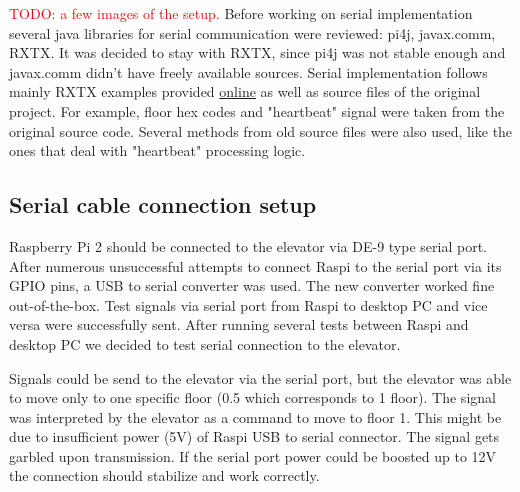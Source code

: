 \documentclass[a4paper, 12pt]{article}
\newcommand\todo[1]{\textcolor{red}{#1}}
\begin{document}
\todo{TODO: a few images of the setup.}
Before working on serial implementation several java libraries for serial communication were reviewed: pi4j, javax.comm, RXTX.
It was decided to stay with RXTX, since pi4j was not stable enough and javax.comm didn't have freely available sources.
Serial implementation follows mainly RXTX examples provided \href{http://rxtx.qbang.org/wiki/index.php/Two_way_communcation_with_the_serial_port}{online} as well as source files of the original project.
For example, floor hex codes and "heartbeat" signal were taken from the original source code.
Several methods from old source files were also used, like the ones that deal with "heartbeat" processing logic.

\subsection{Serial cable connection setup}
\label{sec:Serial_cable_connection_setup}
Raspberry Pi 2 should be connected to the elevator via DE-9 type serial port.
After numerous unsuccessful attempts to connect Raspi to the serial port via its GPIO pins, a USB to serial converter was used.
The new converter worked fine out-of-the-box.
Test signals via serial port from Raspi to desktop PC and vice versa were successfully sent.
After running several tests between Raspi and desktop PC we decided to test serial connection to the elevator.

Signals could be send to the elevator via the serial port, but the elevator was able to move only to one specific floor (0.5 which corresponds to 1 floor).
The signal was interpreted by the elevator as a command to move to floor 1.
This might be due to insufficient power (5V) of Raspi USB to serial connector.
The signal gets garbled upon transmission.
If the serial port power could be boosted up to 12V the connection should stabilize and work correctly.
\end{document}
